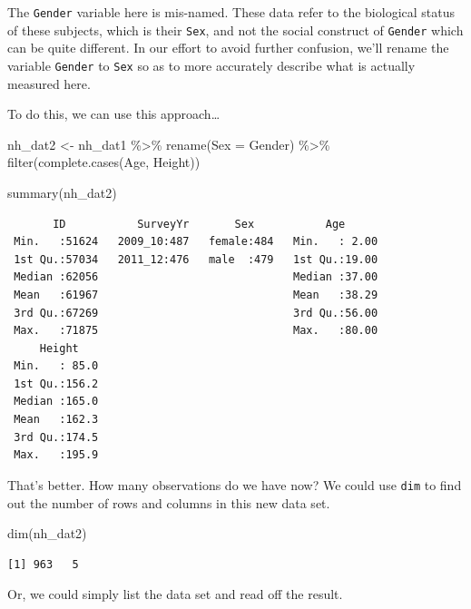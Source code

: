 \documentclass[
]{book}
\newenvironment{Shaded}{\begin{snugshade}}{\end{snugshade}}
\newcommand{\AttributeTok}[1]{\textcolor[rgb]{0.77,0.63,0.00}{#1}}
\newcommand{\FunctionTok}[1]{\textcolor[rgb]{0.00,0.00,0.00}{#1}}
\newcommand{\NormalTok}[1]{#1}
\newcommand{\OtherTok}[1]{\textcolor[rgb]{0.56,0.35,0.01}{#1}}
\newcommand{\SpecialCharTok}[1]{\textcolor[rgb]{0.00,0.00,0.00}{#1}}
\begin{document}
The \texttt{Gender} variable here is mis-named. These data refer to the biological status of these subjects, which is their \texttt{Sex}, and not the social construct of \texttt{Gender} which can be quite different. In our effort to avoid further confusion, we'll rename the variable \texttt{Gender} to \texttt{Sex} so as to more accurately describe what is actually measured here.

To do this, we can use this approach\ldots{}

\begin{Shaded}
\begin{Highlighting}[]
\NormalTok{nh\_dat2 }\OtherTok{\textless{}{-}}\NormalTok{ nh\_dat1 }\SpecialCharTok{\%\textgreater{}\%}
    \FunctionTok{rename}\NormalTok{(}\AttributeTok{Sex =}\NormalTok{ Gender) }\SpecialCharTok{\%\textgreater{}\%}
    \FunctionTok{filter}\NormalTok{(}\FunctionTok{complete.cases}\NormalTok{(Age, Height)) }

\FunctionTok{summary}\NormalTok{(nh\_dat2)}
\end{Highlighting}
\end{Shaded}

\begin{verbatim}
       ID           SurveyYr       Sex           Age       
 Min.   :51624   2009_10:487   female:484   Min.   : 2.00  
 1st Qu.:57034   2011_12:476   male  :479   1st Qu.:19.00  
 Median :62056                              Median :37.00  
 Mean   :61967                              Mean   :38.29  
 3rd Qu.:67269                              3rd Qu.:56.00  
 Max.   :71875                              Max.   :80.00  
     Height     
 Min.   : 85.0  
 1st Qu.:156.2  
 Median :165.0  
 Mean   :162.3  
 3rd Qu.:174.5  
 Max.   :195.9  
\end{verbatim}

That's better. How many observations do we have now? We could use \texttt{dim} to find out the number of rows and columns in this new data set.

\begin{Shaded}
\begin{Highlighting}[]
\FunctionTok{dim}\NormalTok{(nh\_dat2)}
\end{Highlighting}
\end{Shaded}

\begin{verbatim}
[1] 963   5
\end{verbatim}

Or, we could simply list the data set and read off the result.
\end{document}
